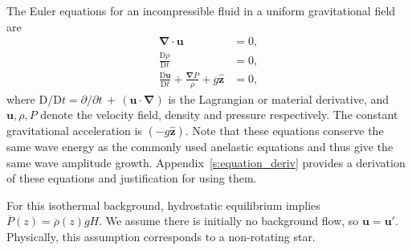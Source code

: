 \documentclass[
        fleqn,
        usenatbib,
    ]{mnras}
\newcommand*{\mdil}[2]{\mathrm{D}#1/\mathrm{D}#2}
\newcommand*{\pdil}[2]{\partial#1/\partial#2}
\newcommand*{\md}[2]{\frac{\mathrm{D}#1}{\mathrm{D}#2}}
\newcommand*{\p}[1]{\left(#1\right)}
\newcommand*{\bm}[1]{\mathbf{#1}}
\newcommand*{\uv}[1]{\hat{\mathbf{#1}}}
\begin{document}
The Euler equations for an incompressible fluid in a uniform gravitational field
are
\begin{subequations}\label{se:nl_orig}
    \begin{align}
        \bm{\nabla} \cdot \bm{u} &= 0,\label{eq:nl_incomp}\\
        \md{\rho}{t} &= 0 ,\label{eq:nl_density}\\
        \md{\bm{u}}{t} + \frac{\bm{\nabla}P}{\rho} + g\uv{z} &=
            0\label{eq:nl_mom},
    \end{align}
\end{subequations}
where $\mdil{}{t} = \pdil{}{t}\,+\,\p{\bm{u} \cdot \bm{\nabla}}$ is the
Lagrangian or material derivative, and $\bm{u}, \rho, P$ denote the velocity
field, density and pressure respectively. The constant gravitational
acceleration is $(-g\uv{z})$. Note that these equations
conserve the same wave energy as the commonly used anelastic equations
\citep{ogura1962scale,anel_part1} and thus give the same wave amplitude
growth. Appendix~\ref{s:equation_deriv} provides a derivation of these
equations and justification for using them.

For this isothermal background, hydrostatic equilibrium implies
$\overline{P}(z) = \overline{\rho}(z) g H$. We assume there is
initially no background flow, so $\bm{u} = \bm{u}'$. Physically, this assumption
corresponds to a non-rotating star.
\end{document}
